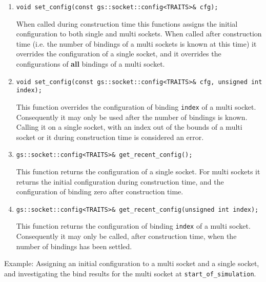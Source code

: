 \documentclass[a4paper,10pt]{article}          %
\begin{document}
\begin{enumerate}
\item 
\verb|void set_config(const gs::socket::config<TRAITS>& cfg);|

When called during construction time this functions assigns the initial configuration to both single and multi sockets. When called after construction time (i.e. the number of bindings of a multi sockets is known at this time) it overrides the configuration of a single socket, and it overrides the configurations of \textbf{all} bindings of a multi socket.

\item 
\verb|void set_config(const gs::socket::config<TRAITS>& cfg, unsigned int index);|

This function overrides the configuration of binding \verb|index| of a multi socket. Consequently it may only be used after the number of bindings is known. 
Calling it on a single socket, with an index out of the bounds of a multi socket or it during construction time is considered an error.

\item
\verb|gs::socket::config<TRAITS>& get_recent_config();|

This function returns the configuration of a single socket. For multi sockets it returns the initial configuration during construction time, and the configuration of binding zero after construction time.

\item
\verb|gs::socket::config<TRAITS>& get_recent_config(unsigned int index);|

This function returns the configuration of binding \verb|index| of a multi socket. Consequently it may only be called, after construction time, when the number of bindings has been settled.

\end{enumerate}

Example: Assigning an initial configuration to a multi socket and a single socket, and investigating the bind results for the multi socket at \verb|start_of_simulation|.
\end{document}
